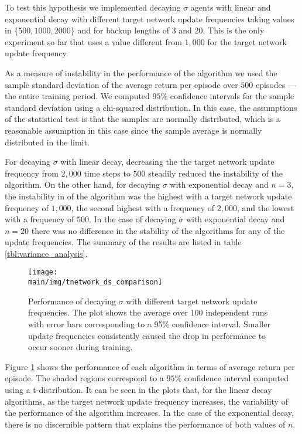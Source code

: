 To test this hypothesis we implemented decaying $\sigma$ agents with linear and exponential decay with different target network update frequencies taking values in $\{500, 1000, 2000 \}$ and for backup lengths of $3$ and $20$.
This is the only experiment so far that uses a value different from $1,000$ for the target network update frequency.

As a measure of instability in the performance of the algorithm we used the sample standard deviation of the average return per episode over $500$ episodes --- the entire training period.
We computed $95\%$ confidence intervals for the sample standard deviation using a chi-squared distribution.
In this case, the assumptions of the statistical test is that the samples are normally distributed, which is a reasonable assumption in this case since the sample average is normally distributed in the limit.

For decaying $\sigma$ with linear decay, decreasing the the target network update frequency from $2,000$ time steps to $500$ steadily reduced the instability of the algorithm.
On the other hand, for decaying $\sigma$ with exponential decay and $n = 3$, the instability in of the algorithm was the highest with a target network update frequency of $1,000$, the second highest with a frequency of $2,000$, and the lowest with a frequency of $500$.
In the case of decaying $\sigma$ with exponential decay and $n = 20$ there was no difference in the stability of the algorithms for any of the update frequencies. 
The summary of the results are listed in table \ref{tbl:variance_analysis}.

\begin{figure}[t]
    \setlength{\abovecaptionskip}{0pt plus 0pt minus 0pt}
    \centering
    \texttt{[image: \\main/img/tnetwork\_ds\_comparison]}
    \caption[Performance of Decaying $\sigma$ with Different Target Network Update Frequencies] {Performance of decaying $\sigma$ with different target network update frequencies.
    The plot shows the average over 100 independent runs with error bars corresponding to a 95\% confidence interval.
    Smaller update frequencies consistently caused the drop in performance to occur sooner during training.
    }
    \label{fig:tnetwork_ds_comparison}
\end{figure}

Figure \ref{fig:tnetwork_ds_comparison} shows the performance of each algorithm in terms of average return per episode.
The shaded regions correspond to a $95\%$ confidence interval computed using a t-distribution.
It can be seen in the plots that, for the linear decay algorithms, as the target network update frequency increases, the variability of the performance of the algorithm increases.
In the case of the exponential decay, there is no discernible pattern that explains the performance of both values of $n$.

